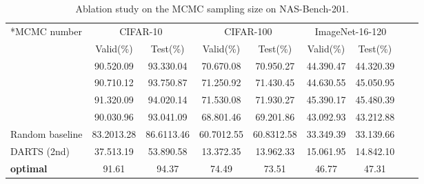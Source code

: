 \documentclass[10pt,twocolumn,letterpaper]{article}
\begin{document}
\begin{table*}[ht]
\centering
\caption{Ablation study on the MCMC sampling size on NAS-Bench-201. }
\begin{tabular}
{|l|c|c|c|c|c|c|c|c|}
\hline

{\multirow{2}*{MCMC number}}&\multicolumn{2}{c|}{CIFAR-10}&\multicolumn{2}{c|}{CIFAR-100}&\multicolumn{2}{c|}{ImageNet-16-120}\\
~&\multicolumn{1}{c}{Valid(\%)}&\multicolumn{1}{c|}{Test(\%)}&\multicolumn{1}{c}{Valid(\%)}&\multicolumn{1}{c|}{Test(\%) }&\multicolumn{1}{c}{Valid(\%) }&\multicolumn{1}{c|}{Test(\%)}\\
\hline
\hline
&90.520.09&93.330.04&70.670.08&70.950.27&44.390.47&44.320.39\\
&90.710.12&93.750.87&71.250.92&71.430.45&44.630.55&45.050.95\\
&91.320.09&94.020.14&71.530.08&71.930.27&45.390.17&45.480.39\\
&90.030.96&93.041.09&68.801.46&69.201.86&43.092.93&43.212.88\\
\hline
Random baseline&83.2013.28&86.6113.46&60.7012.55&60.8312.58&33.349.39&33.139.66\\
DARTS (2nd)&37.513.19&53.890.58&13.372.35&13.962.33&15.061.95&14.842.10\\
\textbf{optimal}&91.61&94.37&74.49&73.51&46.77&47.31\\
\hline
\end{tabular}
\flushleft{}
\label{tab:M_ablation}
\end{table*}
\end{document}
